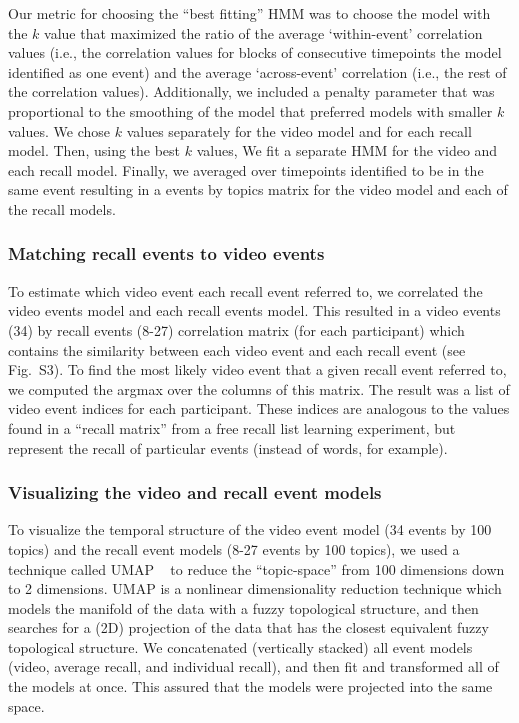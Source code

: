 \documentclass{article}
\newcommand{\matchmats}{S3}
\begin{document}
Our metric for choosing the ``best fitting'' HMM was to choose the model with the $k$ value that maximized the ratio of the average `within-event' correlation values (i.e., the correlation values for blocks of consecutive timepoints the model identified as one event) and the average `across-event' correlation (i.e., the rest of the correlation values). Additionally, we included a penalty parameter that was proportional to the smoothing of the model that preferred models with smaller $k$ values. We chose $k$ values separately for the video model and for each recall model.  Then, using the best $k$ values, We fit a separate HMM for the video and each recall model. Finally, we averaged over timepoints identified to be in the same event resulting in a events by topics matrix for the video model and each of the recall models.

\subsubsection*{Matching recall events to video events}
To estimate which video event each recall event referred to, we correlated the video events model and each recall events model. This resulted in a video events (34) by recall events (8-27) correlation matrix (for each participant) which contains the similarity between each video event and each recall event (see Fig.~\matchmats).  To find the most likely video event that a given recall event referred to, we computed the argmax over the columns of this matrix.  The result was a list of video event indices for each participant. These indices are analogous to the values found in a ``recall matrix'' from a free recall list learning experiment, but represent the recall of particular events (instead of words, for example).

\subsubsection*{Visualizing the video and recall event models}
To visualize the temporal structure of the video event model (34 events by 100 topics) and the recall event models (8-27 events by 100 topics), we used a technique called UMAP ~\citep{McInHeal18} to reduce the ``topic-space'' from 100 dimensions down to 2 dimensions. UMAP is a nonlinear dimensionality reduction technique which models the manifold of the data with a fuzzy topological structure, and then searches for a (2D) projection of the data that has the closest equivalent fuzzy topological structure. We concatenated (vertically stacked) all event models (video, average recall, and individual recall), and then fit and transformed all of the models at once. This assured that the models were projected into the same space.
\end{document}
